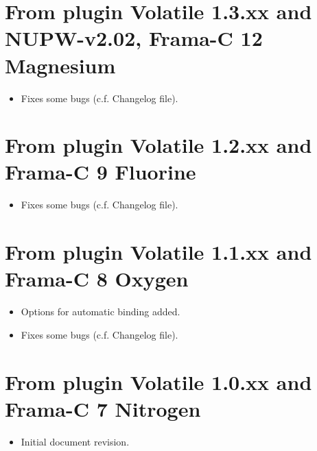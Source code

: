 \section*{From plugin Volatile 1.3.xx and NUPW-v2.02, Frama-C 12 Magnesium }
\begin{itemize}
\item Fixes some bugs (c.f. Changelog file).
\end{itemize}

\section*{From plugin Volatile 1.2.xx and Frama-C 9 Fluorine }
\begin{itemize}
\item Fixes some bugs (c.f. Changelog file).
\end{itemize}

\section*{From plugin Volatile 1.1.xx and Frama-C 8 Oxygen }
\begin{itemize}
\item Options for automatic binding added.
\item Fixes some bugs (c.f. Changelog file).
\end{itemize}

\section*{From plugin Volatile 1.0.xx and Frama-C 7 Nitrogen }
\begin{itemize}
\item Initial document revision.
\end{itemize}
